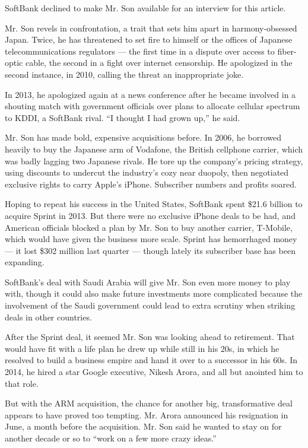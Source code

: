 SoftBank declined to make Mr. Son available for an interview for this
article.

Mr. Son revels in confrontation, a trait that sets him apart in
harmony-obsessed Japan. Twice, he has threatened to set fire to himself
or the offices of Japanese telecommunications regulators --- the first
time in a dispute over access to fiber-optic cable, the second in a
fight over internet censorship. He apologized in the second instance, in
2010, calling the threat an inappropriate joke.

In 2013, he apologized again at a news conference after he became
involved in a shouting match with government officials over plans to
allocate cellular spectrum to KDDI, a SoftBank rival. ``I thought I had
grown up,'' he said.

Mr. Son has made bold, expensive acquisitions before. In 2006, he
borrowed heavily to buy the Japanese arm of Vodafone, the British
cellphone carrier, which was badly lagging two Japanese rivals. He tore
up the company's pricing strategy, using discounts to undercut the
industry's cozy near duopoly, then negotiated exclusive rights to carry
Apple's iPhone. Subscriber numbers and profits soared.

Hoping to repeat his success in the United States, SoftBank spent \$21.6
billion to acquire Sprint in 2013. But there were no exclusive iPhone
deals to be had, and American officials blocked a plan by Mr. Son to buy
another carrier, T-Mobile, which would have given the business more
scale. Sprint has hemorrhaged money --- it lost \$302 million last
quarter --- though lately its subscriber base has been expanding.

SoftBank's deal with Saudi Arabia will give Mr. Son even more money to
play with, though it could also make future investments more complicated
because the involvement of the Saudi government could lead to extra
scrutiny when striking deals in other countries.

After the Sprint deal, it seemed Mr. Son was looking ahead to
retirement. That would have fit with a life plan he drew up while still
in his 20s, in which he resolved to build a business empire and hand it
over to a successor in his 60s. In 2014, he hired a star Google
executive, Nikesh Arora, and all but anointed him to that role.

But with the ARM acquisition, the chance for another big, transformative
deal appears to have proved too tempting. Mr. Arora announced his
resignation in June, a month before the acquisition. Mr. Son said he
wanted to stay on for another decade or so to ``work on a few more crazy
ideas.''

